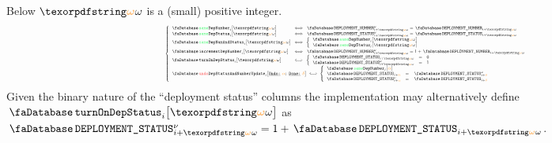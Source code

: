 Below $\relof$ is a (small) positive integer.
\[
	\resizebox{.95\linewidth}{!}{$
	\left\{ \begin{array}{lcl}
		\accSameDeploymentNumber  {i}{\relof} & \!\!\! \iff \!\!\! & \accDeploymentNumber\new_{i + \relof} = \accDeploymentNumber_{i + \relof} \\
		\accSameDeploymentStatus  {i}{\relof} & \!\!\! \iff \!\!\! & \accDeploymentStatus\new_{i + \relof} = \accDeploymentStatus_{i + \relof} \\
		\accSameDeployment        {i}{\relof} & \!\!\! \iff \!\!\! &
		\left\{ \begin{array}{lcl}
			\multicolumn{3}{l}{\accSameDeploymentNumber {i}{\relof} } \\
			\multicolumn{3}{l}{\accSameDeploymentStatus {i}{\relof} } \\
		\end{array} \right. \vspace{1mm} \\
		\accIncrementDeploymentNumber  {i}{\relof} & \!\!\! \iff \!\!\! & \accDeploymentNumber\new_{i + \relof} = 1 + \accDeploymentNumber_{i + \relof} \\
		\accTurnOnDepStatus            {i}{\relof} & \!\!\! \iff \!\!\! &
		\left\{ \begin{array}{lcl}
			\accDeploymentStatus      _{i + \relof} & = & 0 \\
			\accDeploymentStatus\new  _{i + \relof} & = & 1 \\
		\end{array} \right. \\
		\multicolumn{3}{l}{
			\accUndoDeploymentStatusAndNumberUpdate {i}{\reluo}{\reldo} \iff
			\left\{ \begin{array}{lcl}
				\multicolumn{3}{l}{\accSameDeploymentNumber {i}{\reluo}} \\
				\accDeploymentStatus      _{i + \reluo} & = & \accDeploymentStatus\new  _{i + \reldo} \\
				\accDeploymentStatus\new  _{i + \reluo} & = & \accDeploymentStatus      _{i + \reldo} \\
			\end{array} \right. } \\
		\end{array} \right.
	$}
\]
\saNote{}
Given the binary nature of the ``deployment status'' columns
the implementation may alternatively define $\accTurnOnDepStatus {i}{\relof}$
as $\accDeploymentStatus\new _{i + \relof} = 1 + \accDeploymentStatus _{i + \relof}$.

